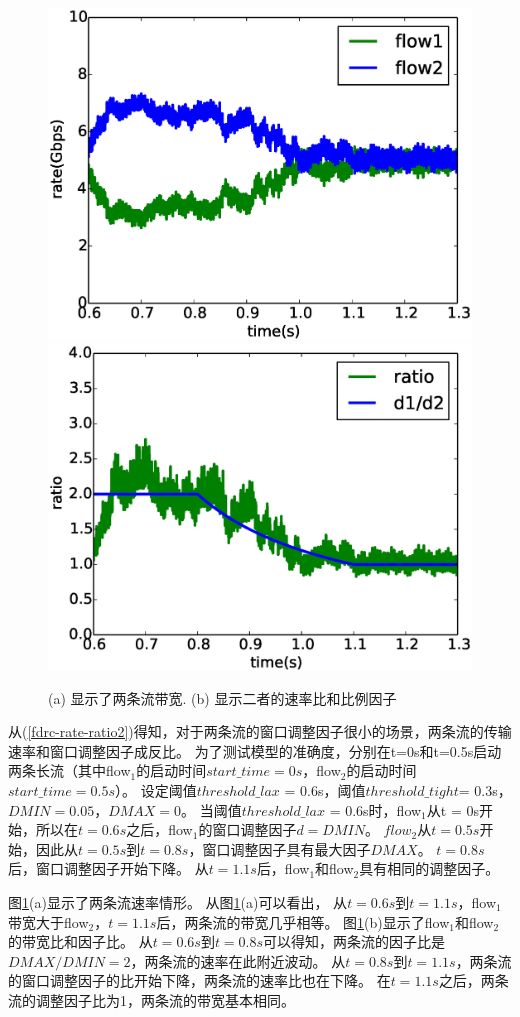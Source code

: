\begin{figure}[h]
\centering
{}
 {\includegraphics[width=0.48\columnwidth]{figures/FDRC/model/rate.eps}}
{\includegraphics[width=0.48\columnwidth]{figures/FDRC/model/ratio.eps}}
\caption{(a) 显示了两条流带宽. (b) 显示二者的速率比和比例因子}
\label{fdrc-model-rate-ratio}
\end{figure}





从(\ref{fdrc-rate-ratio2})得知，对于两条流的窗口调整因子很小的场景，两条流的传输速率和窗口调整因子成反比。
为了测试模型的准确度，分别在t=0s和t=0.5s启动两条长流（其中flow$_1$的启动时间$start\_time = 0s$，flow$_2$的启动时间$start\_time = 0.5s$）。
设定阈值$threshold\_lax$ = 0.6s，阈值$threshold\_tight$= 0.3s，$DMIN = 0.05$，$DMAX = 0$。
当阈值$threshold\_lax$ = 0.6s时，flow$_1$从t = 0s开始，所以在$t = 0.6s$之后，flow$_1$的窗口调整因子$d= DMIN$。
$flow_2$从$t = 0.5s$开始，因此从$t = 0.5s$到$t = 0.8s$，窗口调整因子具有最大因子$DMAX$。
$t = 0.8s$后，窗口调整因子开始下降。
从$t = 1.1s$后，flow$_1$和flow$_2$具有相同的调整因子。

图\ref{fdrc-model-rate-ratio}(a)显示了两条流速率情形。
从图\ref{fdrc-model-rate-ratio}(a)可以看出，
从$t = 0.6s$到$t = 1.1s$，flow$_1$带宽大于flow$_2$，$t = 1.1s$后，两条流的带宽几乎相等。
图\ref{fdrc-model-rate-ratio}(b)显示了flow$_1$和flow$_2$的带宽比和因子比。
从$t = 0.6s$到$t = 0.8s$可以得知，两条流的因子比是$DMAX/DMIN = 2$，两条流的速率在此附近波动。
从$t = 0.8s$到$t = 1.1s$，两条流的窗口调整因子的比开始下降，两条流的速率比也在下降。
在$t = 1.1s$之后，两条流的调整因子比为1，两条流的带宽基本相同。

